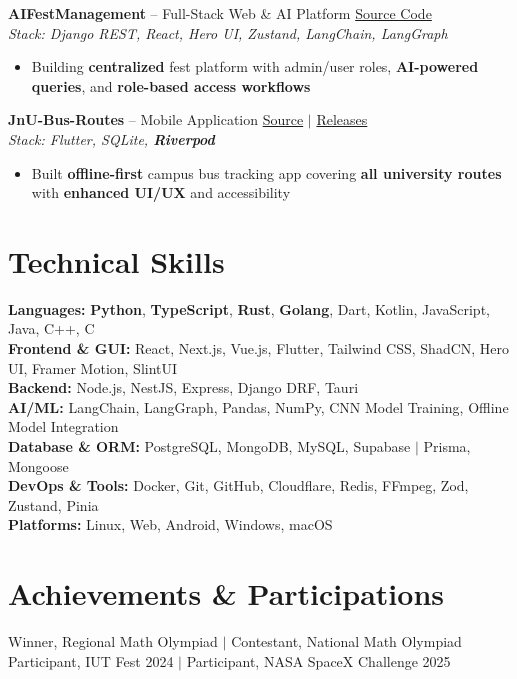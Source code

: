 \documentclass[10pt,a4paper]{article}
\begin{document}
\textbf{AIFestManagement} -- Full-Stack Web \& AI Platform \hfill \href{https://github.com/AhmedTrooper/AIFestManagement}{Source Code} \\
\textit{Stack: Django REST, React, Hero UI, Zustand, LangChain, LangGraph} \\[-6pt]
\begin{itemize}[leftmargin=12pt, itemsep=0pt, topsep=2pt]
    \item Building \textbf{centralized} fest platform with admin/user roles, \textbf{AI-powered queries}, and \textbf{role-based access workflows}
\end{itemize}

\textbf{JnU-Bus-Routes} -- Mobile Application \hfill \href{https://github.com/AhmedTrooper/JnU-Bus-Routes}{Source} $|$ \href{https://github.com/AhmedTrooper/JnU-Bus-Routes/releases}{Releases} \\
\textit{Stack: Flutter, SQLite, \textbf{Riverpod}} \\[-6pt]
\begin{itemize}[leftmargin=12pt, itemsep=0pt, topsep=2pt]
    \item Built \textbf{offline-first} campus bus tracking app covering \textbf{all university routes} with \textbf{enhanced UI/UX} and accessibility
\end{itemize}

\section{Technical Skills}
\textbf{Languages:} \textbf{Python}, \textbf{TypeScript}, \textbf{Rust}, \textbf{Golang}, Dart, Kotlin, JavaScript, Java, C++, C \\
\textbf{Frontend \& GUI:} React, Next.js, Vue.js, Flutter, Tailwind CSS, ShadCN, Hero UI, Framer Motion, SlintUI \\
\textbf{Backend:} Node.js, NestJS, Express, Django DRF, Tauri \\
\textbf{AI/ML:} LangChain, LangGraph, Pandas, NumPy, CNN Model Training, Offline Model Integration \\
\textbf{Database \& ORM:} PostgreSQL, MongoDB, MySQL, Supabase $|$ Prisma, Mongoose \\
\textbf{DevOps \& Tools:} Docker, Git, GitHub, Cloudflare, Redis, FFmpeg, Zod, Zustand, Pinia \\
\textbf{Platforms:} Linux, Web, Android, Windows, macOS

\section{Achievements \& Participations}
Winner, Regional Math Olympiad $|$ Contestant, National Math Olympiad \\
Participant, IUT Fest 2024 $|$ Participant, NASA SpaceX Challenge 2025
\end{document}
